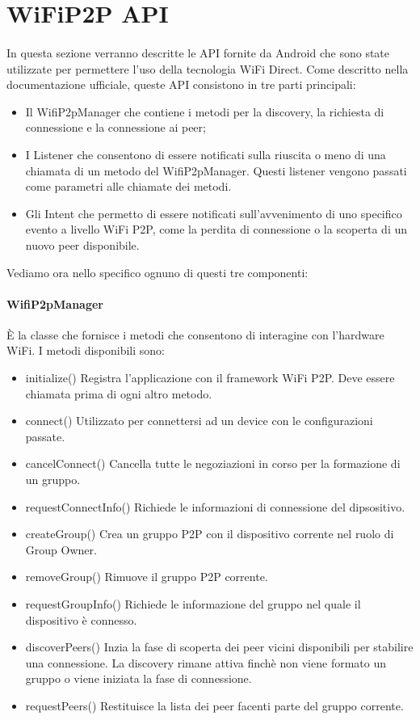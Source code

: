 \documentclass{llncs}
\begin{document}
\section{WiFiP2P API} 
\paragraph{}In questa sezione verranno descritte le API fornite da Android che sono state utilizzate per permettere l'uso della tecnologia WiFi Direct. Come descritto nella documentazione ufficiale, queste API consistono in tre parti principali:

\begin{itemize}
	\item Il WifiP2pManager che contiene i metodi per la discovery, la richiesta di connessione e la connessione ai peer;
	\item I Listener che consentono di essere notificati sulla riuscita o meno di una chiamata di un metodo del WifiP2pManager. Questi listener vengono passati come parametri alle chiamate dei metodi.
	\item Gli Intent che permetto di essere notificati sull'avvenimento di uno specifico evento a livello WiFi P2P, come la perdita di connessione o la scoperta di un nuovo peer disponibile.
\end{itemize}
Vediamo ora nello specifico ognuno di questi tre componenti:

\paragraph{WifiP2pManager}
È la classe che fornisce i metodi che consentono di interagine con l'hardware WiFi. I metodi disponibili sono:
\begin{itemize}
	\item{initialize()} Registra l'applicazione con il framework WiFi P2P. Deve essere chiamata prima di ogni altro metodo.
	\item{connect()} Utilizzato per connettersi ad un device con le configurazioni passate.
	\item{cancelConnect()} Cancella tutte le negoziazioni in corso per la formazione di un gruppo.
	\item{requestConnectInfo()} Richiede le informazioni di connessione del dipsositivo.
	\item{createGroup()} Crea un gruppo P2P con il dispositivo corrente nel ruolo di Group Owner.
	\item{removeGroup()} Rimuove il gruppo P2P corrente.
	\item{requestGroupInfo()} Richiede le informazione del gruppo nel quale il dispositivo è connesso.
	\item{discoverPeers()} Inzia la fase di scoperta dei peer vicini disponibili per stabilire una connessione. La discovery rimane attiva finchè non viene formato un gruppo o viene iniziata la fase di connessione.
	\item{requestPeers()} Restituisce la lista dei peer facenti parte del gruppo corrente.
\end{itemize}
\end{document}
